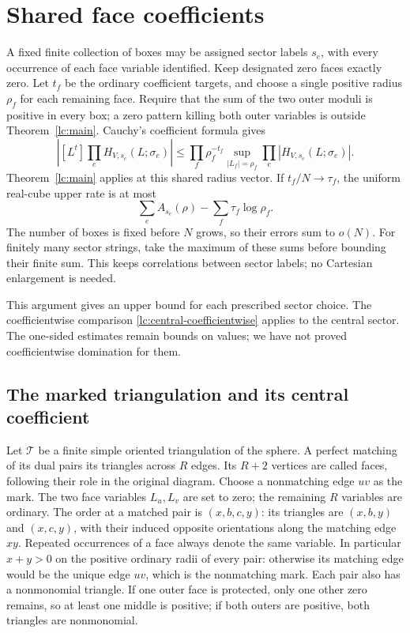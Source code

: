 \section{Shared face coefficients}\label{cs:shared}
A fixed finite collection of boxes may be assigned sector labels
\(s_e\), with every occurrence of each face variable identified.
Keep designated zero faces exactly zero. Let \(t_f\) be the ordinary
coefficient targets, and choose a single positive radius \(\rho_f\)
for each remaining face. Require that the sum of the two outer moduli
is positive in every box; a zero pattern killing both outer variables
is outside Theorem~\ref{lc:main}. Cauchy's coefficient formula gives
\[
 \left|[L^t]\prod_eH_{V,s_e}(L;\sigma_e)\right|
 \le\prod_f\rho_f^{-t_f}
       \sup_{|L_f|=\rho_f}\prod_e|H_{V,s_e}(L;\sigma_e)|.
\]
Theorem~\ref{lc:main} applies at this shared radius vector. If
\(t_f/N\to\tau_f\), the uniform real-cube upper rate is at most
\[
                      \sum_eA_{s_e}(\rho)-\sum_f\tau_f\log\rho_f .
\]
The number of boxes is fixed before \(N\) grows, so their errors sum
to \(o(N)\). For finitely many sector strings, take the maximum of
these sums before bounding their finite sum. This keeps correlations
between sector labels; no Cartesian enlargement is needed.

This argument gives an upper bound for each prescribed sector choice.
The coefficientwise comparison \eqref{lc:central-coefficientwise} applies
to the central sector. The one-sided estimates remain bounds on values;
we have not proved coefficientwise domination for them.

\subsection{The marked triangulation and its central coefficient}
Let $\mathcal T$ be a finite simple oriented triangulation of the sphere.
A perfect matching of its dual pairs its triangles across $R$ edges.
Its $R+2$ vertices are called faces, following their role in the original
diagram. Choose a nonmatching edge $uv$ as the mark. The two face
variables $L_u,L_v$ are set to zero; the remaining $R$ variables are
ordinary. The order at a matched pair is $(x,b,c,y)$: its triangles
are $(x,b,y)$ and $(x,c,y)$, with their induced opposite orientations
along the matching edge $xy$. Repeated occurrences of a face always
denote the same variable.
In particular $x+y>0$ on the positive ordinary radii of every pair:
otherwise its matching edge would be the unique edge $uv$, which is
the nonmatching mark. Each pair also has a nonmonomial triangle.
If one outer face is protected, only one other zero remains, so at
least one middle is positive; if both outers are positive, both
triangles are nonmonomial.

